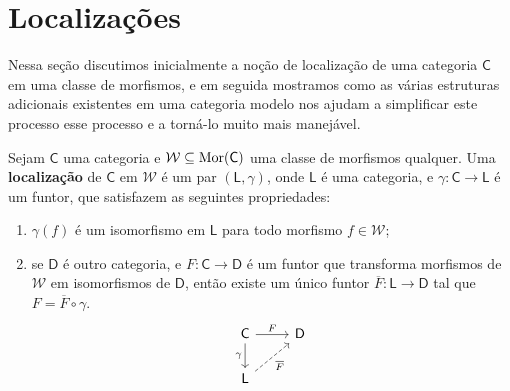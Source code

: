 \section{Localizações}

Nessa seção discutimos inicialmente a noção de localização de uma categoria $\mathsf{C}$ em uma classe de morfismos, e em seguida mostramos como as várias estruturas adicionais existentes em uma categoria modelo nos ajudam a simplificar este processo esse processo e a torná-lo muito mais manejável.

\begin{defin}
  Sejam $\mathsf{C}$ uma categoria e $\mathcal{W} \subseteq \mathrm{Mor}(\mathsf{C})$ uma classe de morfismos qualquer.
  Uma \textbf{localização} de $\mathsf{C}$ em $\mathcal{W}$ é um par $(\mathsf{L},\gamma)$, onde $\mathsf{L}$ é uma categoria, e $\gamma: \mathsf{C} \to \mathsf{L}$ é um funtor, que satisfazem as seguintes propriedades:
  \begin{enumerate}
  \item $\gamma(f)$ é um isomorfismo em $\mathsf{L}$ para todo morfismo $f \in \mathcal{W}$;
    
  \item se $\mathsf{D}$ é outro categoria, e $F: \mathsf{C} \to \mathsf{D}$ é um funtor que transforma morfismos de $\mathcal{W}$ em isomorfismos de $\mathsf{D}$, então existe um único funtor $\overline{F}: \mathsf{L} \to \mathsf{D}$ tal que $F = \overline{F} \circ \gamma$.
    \begin{displaymath}
      \begin{tikzcd}
        \mathsf{C}
        \arrow[r, "F"]
        \arrow[d, "\gamma" swap]
        & \mathsf{D}
        \\ \mathsf{L}
        \arrow[ru, dashed, "\overline{F}" swap]
      \end{tikzcd}
    \end{displaymath}
  \end{enumerate}
\end{defin}




